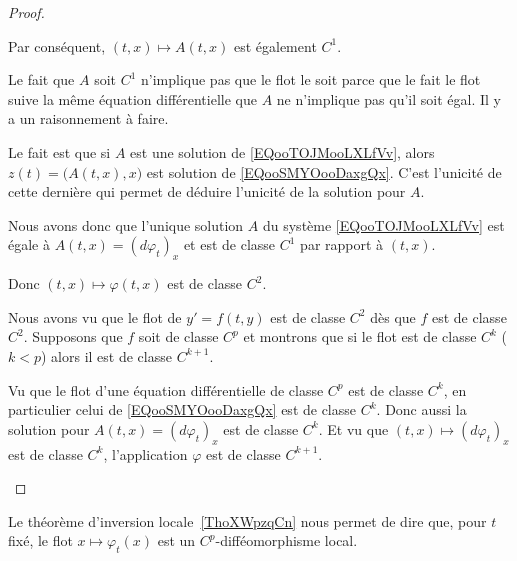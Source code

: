 \begin{proof}
\begin{subproof}
		Par conséquent, \( (t,x)\mapsto A(t,x)\) est également \( C^1\).



		Le fait que \( A\) soit \( C^1\) n'implique pas que le flot le soit parce que le fait le flot suive la même équation différentielle que \( A\) ne n'implique pas qu'il soit égal. Il y a un raisonnement à faire.

		Le fait est que si \( A\) est une solution de \eqref{EQooTOJMooLXLfVv}, alors \( z(t)=\big( A(t,x),x \big)\) est solution de \eqref{EQooSMYOooDaxgQx}. C'est l'unicité de cette dernière qui permet de déduire l'unicité de la solution pour \( A\).

		Nous avons donc que l'unique solution \( A\) du système \eqref{EQooTOJMooLXLfVv} est égale à \( A(t,x)=(d\varphi_t)_x\) et est de classe \( C^1\) par rapport à \( (t,x)\).

		Donc \( (t,x)\mapsto  \varphi(t,x)\) est de classe \( C^2\).

		\spitem[Régularité \( C^p\)]

		Nous avons vu que le flot de \( y'=f(t,y)\) est de classe \( C^2\) dès que \( f\) est de classe \( C^2\). Supposons que \( f\) soit de classe \( C^p\) et montrons que si le flot est de classe \( C^k\) (\( k<p\)) alors il est de classe \( C^{k+1}\).

		Vu que le flot d'une équation différentielle de classe \( C^p\) est de classe \( C^k\), en particulier celui de \eqref{EQooSMYOooDaxgQx} est de classe \( C^k\). Donc aussi la solution pour \( A(t,x)=(d\varphi_t)_x\) est de classe \( C^k\). Et vu que \(  (t,x)\mapsto (d\varphi_t)_x   \) est de classe \( C^k\), l'application \( \varphi\) est de classe \( C^{k+1}\).

	\end{subproof}
\end{proof}

\begin{normaltext}      \label{NORMooWEWVooXbGmfE}
	Le théorème d'inversion locale~\ref{ThoXWpzqCn} nous permet de dire que, pour \( t\) fixé, le flot \( x\mapsto \varphi_t(x)\) est un \( C^p\)-difféomorphisme local.
\end{normaltext}


